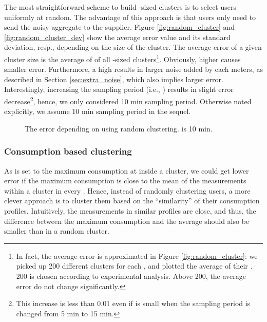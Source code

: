 \documentclass[11pt,a4paper]{article}
\theoremstyle{plain}
\theoremstyle{plain}
\theoremstyle{plain}
\theoremstyle{plain}
\theoremstyle{nonumberplain} \theoremseparator{}
\begin{document}
The most straightforward scheme to build -sized clusters is to select  users uniformly at random. The advantage of this approach is that users only need to send the noisy aggregate to the supplier. 
Figure \ref{fig:random_cluster} and \ref{fig:random_cluster_dev} show the average error value and its standard deviation, resp., depending on the size of the cluster. 
The average error of a given cluster size  is the average of  of all 
-sized clusters\footnote{In fact, the average error is approximated in Figure \ref{fig:random_cluster}:
we picked up 200 different clusters for each , and plotted the average of their . 200 is chosen according to experimental analysis. Above 200, the average error do not change significantly.}. 
Obviously, higher  causes smaller error. Furthermore, a high  results in larger noise added by each meters, as described in Section \ref{sec:extra_noise}, which also implies larger error.
Interestingly, increasing the sampling period (i.e., ) results in slight error decrease\footnote{This increase is less than 0.01 even if  is small when the sampling period is changed from 5 min to 15 min.}, hence, we only considered 10 min sampling period. Otherwise noted explicitly, we assume 10 min sampling period in the sequel. 

\begin{figure*}[ht]
\centering
{}
\caption{\label{fig:random_cluster_main} The error depending on  using random clustering.  is 10 min.}

\end{figure*}


\subsubsection{Consumption based clustering}

As  is set to the maximum consumption at  inside a cluster, we could get lower error if the maximum consumption is close to the mean of the measurements within a cluster in every . Hence, instead of randomly clustering users, a more clever approach is to cluster them based on the ``similarity'' of their consumption profiles. Intuitively, the measurements in similar profiles are close, and thus, the difference between the maximum consumption and the average should also be smaller than in a random cluster.
\end{document}
